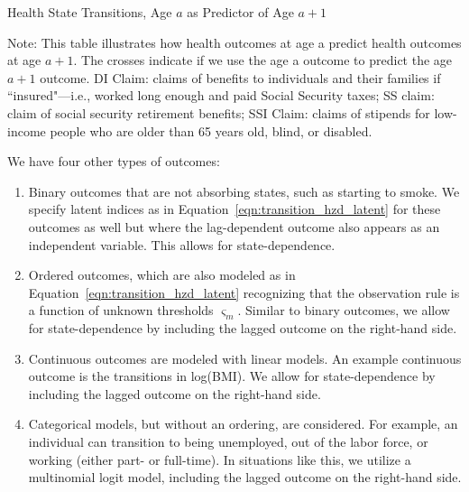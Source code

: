 \begin{table}
\begin{threeparttable}
\caption{Health State Transitions, Age $a$ as Predictor of Age $a+1$}\label{table:transition}
\scriptsize

{\flushleft\footnotesize
Note: This table illustrates how health outcomes at age a predict health outcomes at age $a + 1$. The crosses indicate if we use the age a outcome to predict the age $a + 1$ outcome. DI Claim: claims of benefits to individuals and their families if ``insured"---i.e., worked long enough and paid Social Security taxes; SS claim: claim of social security retirement benefits; SSI Claim: claims of stipends for low-income people who are older than 65 years old, blind, or disabled.}
\end{threeparttable}
\end{table}

%


\noindent We have four other types of outcomes: \\
\begin{enumerate}
\item Binary outcomes that are not absorbing states, such as starting to smoke. We specify latent
indices as in Equation~\eqref{eqn:transition_hzd_latent} for these outcomes as well but where
the lag-dependent outcome also appears as an independent variable. This allows for state-dependence.

\item Ordered outcomes, which are also modeled as in Equation~\eqref{eqn:transition_hzd_latent} recognizing that the observation rule is
a function of unknown thresholds $\varsigma_m$. Similar to binary outcomes, we allow for state-dependence by including the lagged outcome
on the right-hand side.

\item Continuous outcomes are modeled with linear models. An example continuous outcome is the
transitions in log(BMI). We allow for state-dependence by including the lagged outcome on the right-hand side.

\item Categorical models, but without an ordering, are considered. For example, an individual can transition
to being unemployed, out of the labor force, or working (either part- or full-time). In situations like this, we utilize
a multinomial logit model, including the lagged outcome on the right-hand side.

\end{enumerate}

